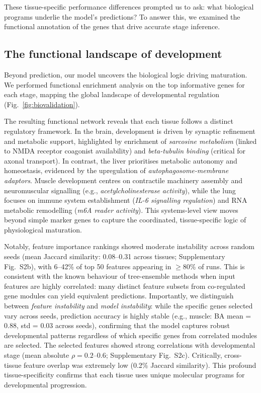 \documentclass[10pt,a4paper]{article}
\newcommand{\figref}[1]{Fig.~\ref{#1}}
\begin{document}
These tissue-specific performance differences prompted us to ask: what biological programs underlie the model's predictions? To answer this, we examined the functional annotation of the genes that drive accurate stage inference.

\subsection{The functional landscape of development}

Beyond prediction, our model uncovers the biological logic driving maturation. We performed functional enrichment analysis on the top informative genes for each stage, mapping the global landscape of developmental regulation (\figref{fig:biovalidation}).

The resulting functional network reveals that each tissue follows a distinct regulatory framework. In the brain, development is driven by synaptic refinement and metabolic support\cite{kang_spatio-temporal_2011,semple_brain_2013}, highlighted by enrichment of \textit{sarcosine metabolism} (linked to NMDA receptor coagonist availability\cite{zhang_glycine_2009}) and \textit{beta-tubulin binding} (critical for axonal transport). In contrast, the liver prioritises metabolic autonomy and homeostasis, evidenced by the upregulation of \textit{autophagosome-membrane adaptors}. Muscle development centres on contractile machinery assembly and neuromuscular signalling (e.g., \textit{acetylcholinesterase activity}\cite{rotundo_expression_2003}), while the lung focuses on immune system establishment\cite{georgountzou_postnatal_2017} (\textit{IL-6 signalling regulation}) and RNA metabolic remodelling (\textit{m6A reader activity}). This systems-level view moves beyond simple marker genes to capture the coordinated, tissue-specific logic of physiological maturation.

Notably, feature importance rankings showed moderate instability across random seeds (mean Jaccard similarity: 0.08--0.31 across tissues; Supplementary Fig.~S2b), with 6--42\% of top 50 features appearing in $\geq$80\% of runs. This is consistent with the known behaviour of tree-ensemble methods when input features are highly correlated: many distinct feature subsets from co-regulated gene modules can yield equivalent predictions. Importantly, we distinguish between \textit{feature instability} and \textit{model instability}: while the specific genes selected vary across seeds, prediction accuracy is highly stable (e.g., muscle: BA mean = 0.88, std = 0.03 across seeds), confirming that the model captures robust developmental patterns regardless of which specific genes from correlated modules are selected. The selected features showed strong correlations with developmental stage (mean absolute $\rho = 0.2$--$0.6$; Supplementary Fig.~S2c). Critically, cross-tissue feature overlap was extremely low (0.2\% Jaccard similarity). This profound tissue-specificity confirms that each tissue uses unique molecular programs for developmental progression.
\end{document}
